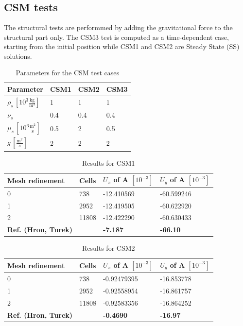 \subsection{CSM tests}
The structural tests are performmed by adding the gravitational force to the structural part only. The CSM3 test is computed as a time-dependent case, starting from the initial position while CSM1 and CSM2 are Steady State (SS) solutions. 
\begin{table}[!ht]
\begin{center}
  \begin{tabular}{l | l | l | l} \hline
	Parameter & CSM1 & CSM2 & CSM3 \\ \hline
    $\rho_s\, [10^3\frac{\text{kg}}{\text{m}^3}]$  & 1 & 1 & 1 \\   \hline
    $\nu_s $ & 0.4 & 0.4 & 0.4 \\ \hline
    $\mu_s \,[10^{6}\frac{\text{m}^2}{\text{s}}]$ & 0.5 & 2 & 0.5   \\ \hline
    $g \, [\frac{\text{m}^2}{s}]$ & 2 & 2 & 2 \\ \hline
    \hline
  \end{tabular}
\end{center}
\caption{Parameters for the CSM test cases}
\end{table}

\begin{table}[!h]
\begin{center}
  \begin{tabular}{l | l | l | l} \hline
	Mesh refinement & Cells & $U_x$ of A $[10^{-3}]$ & $U_y$ of A $[10^{-3}]$\\ \hline
    0  & 738 & -12.410569 & -60.599246 \\   \hline
    1 & 2952 & -12.419505 & -60.622920 \\ \hline
    2 & 11808 & -12.422290 & -60.630433   \\ \hline \hline
    \textbf{Ref. (Hron, Turek)}  & & \textbf{-7.187} & \textbf{-66.10} \\ \hline 
    \hline
  \end{tabular}
\end{center}
\caption{Results for CSM1}
\end{table}

\begin{table}[!h]
\begin{center}
  \begin{tabular}{l | l | l | l} \hline
	Mesh refinement & Cells & $U_x$ of A $[10^{-3}]$ & $U_y$ of A $[10^{-3}]$\\ \hline
    0  & 738 & -0.92479395 & -16.853778 \\   \hline
    1 & 2952 & -0.92558954 & -16.861757 \\ \hline
    2 & 11808 & -0.92583356 & -16.864252   \\ \hline \hline
    \textbf{Ref. (Hron, Turek)}  & & \textbf{-0.4690} & \textbf{-16.97} \\ \hline 
    \hline
  \end{tabular}
\end{center}
\caption{Results for CSM2}
\end{table}




